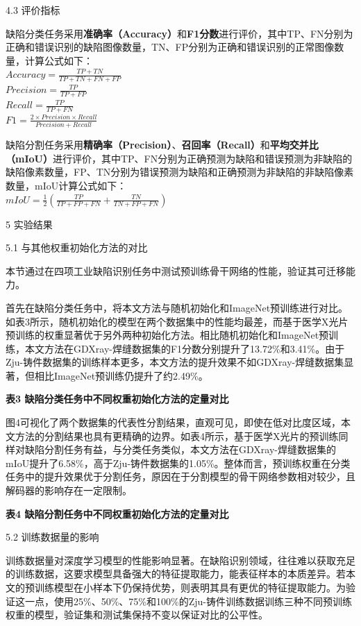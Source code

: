 4.3 评价指标

缺陷分类任务采用\textbf{准确率（Accuracy）}和\textbf{F1分数}进行评价，其中TP、FN分别为正确和错误识别的缺陷图像数量，TN、FP分别为正确和错误识别的正常图像数量，计算公式如下：\\
\(Accuracy =\frac{TP+TN}{TP+TN+FN+FP} \)\\
\(Precision =\frac{TP}{TP+FP} \)\\
\(Recall =\frac{TP}{TP+FN} \)\\
\(F1=\frac{2 × Precision × Recall }{ Precision + Recall } \)

缺陷分割任务采用\textbf{精确率（Precision）}、\textbf{召回率（Recall）}和\textbf{平均交并比（mIoU）}进行评价，其中TP、FN分别为正确预测为缺陷和错误预测为非缺陷的缺陷像素数量，FP、TN分别为错误预测为缺陷和正确预测为非缺陷的非缺陷像素数量，mIoU计算公式如下：\\
\(mIoU=\frac{1}{2}\left(\frac{TP}{TP+FP+FN}+\frac{TN}{TN+FP+FN}\right)\)

5 实验结果

5.1	与其他权重初始化方法的对比

本节通过在四项工业缺陷识别任务中测试预训练骨干网络的性能，验证其可迁移能力。

首先在缺陷分类任务中，将本文方法与随机初始化和ImageNet预训练进行对比。如表3所示，随机初始化的模型在两个数据集中的性能均最差，而基于医学X光片预训练的权重显著优于另外两种初始化方法。相比随机初始化和ImageNet预训练，本文方法在GDXray-焊缝数据集的F1分数分别提升了13.72\%和3.41\%。由于Zju-铸件数据集的训练样本更多，本文方法的提升效果不如GDXray-焊缝数据集显著，但相比ImageNet预训练仍提升了约2.49\%。

\textbf{表3 缺陷分类任务中不同权重初始化方法的定量对比}

图4可视化了两个数据集的代表性分割结果，直观可见，即使在低对比度区域，本文方法的分割结果也具有更精确的边界。如表4所示，基于医学X光片的预训练同样对缺陷分割任务有益，与分类任务类似，本文方法在GDXray-焊缝数据集的mIoU提升了6.58\%，高于Zju-铸件数据集的1.05\%。整体而言，预训练权重在分类任务中的提升效果优于分割任务，原因在于分割模型的骨干网络参数相对较少，且解码器的影响存在一定限制。

\textbf{表4 缺陷分割任务中不同权重初始化方法的定量对比}

5.2	训练数据量的影响

训练数据量对深度学习模型的性能影响显著。在缺陷识别领域，往往难以获取充足的训练数据，这要求模型具备强大的特征提取能力，能表征样本的本质差异。若本文的预训练模型在小样本下仍保持优势，则表明其具有更优的特征提取能力。为验证这一点，使用25\%、50\%、75\%和100\%的Zju-铸件训练数据训练三种不同预训练权重的模型，验证集和测试集保持不变以保证对比的公平性。

